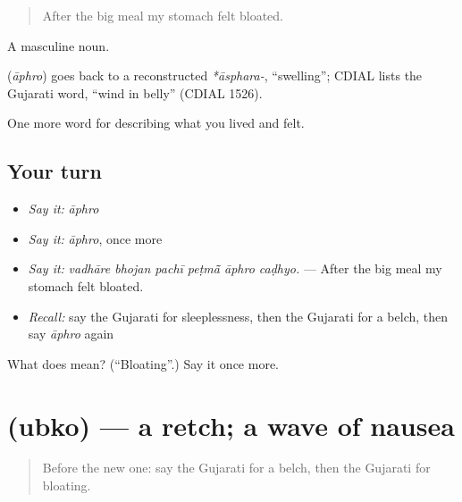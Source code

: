 \begin{quote}
After the big meal my stomach felt bloated.
\end{quote}

A masculine noun.

\begin{cousinweb}
\textbf{} (\emph{āphro}) goes back to a reconstructed \emph{*āsphara-}, \textquotedblleft{}swelling\textquotedblright{}; CDIAL lists the Gujarati word, \textquotedblleft{}wind in belly\textquotedblright{} (CDIAL 1526).
\end{cousinweb}

\begin{grammarlens}[title={What you've built}]
One more word for describing what you lived and felt.
\end{grammarlens}

\subsection*{Your turn}
\begin{itemize}
\raggedright
  \item \emph{Say it:} \emph{āphro}
  \item \emph{Say it:} \emph{āphro}, once more
  \item \emph{Say it:} \emph{vadhāre bhojan pachī peṭmā̃ āphro caḍhyo.} — After the big meal my stomach felt bloated.
  \item \emph{Recall:} say the Gujarati for sleeplessness, then the Gujarati for a belch, then say \emph{āphro} again
\end{itemize}

\begin{tcolorbox}[breakable,colback=teal!4,colframe=teal!35!black,title={Before you move on}]
What does  mean? (\textquotedblleft{}Bloating\textquotedblright{}.) Say it once more.
\end{tcolorbox}
\section[\texorpdfstring{\gu{ઉબકો} (ubko)}{ઉબકો (ubko)}]{ (ubko) — a retch; a wave of nausea}

\label{lesson:GU-C477-ubko}



\begin{quote}
Before the new one: say the Gujarati for a belch, then the Gujarati for bloating.
\end{quote}

